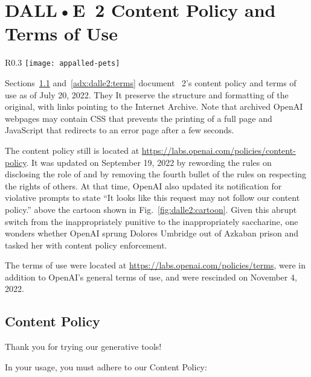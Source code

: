 
\newpage
\section{DALL•E~2 Content Policy and Terms of Use}
\label{adx:dalle2:policies}

\begin{wrapfigure}[9]{R}{0.3\textwidth}
\centering
\texttt{[image: appalled-pets]}
\caption{Be nice to \DALLE's pets!}\label{fig:dalle2:cartoon}
\end{wrapfigure}

Sections~\ref{adx:dalle2:contentpolicy} and~\ref{adx:dalle2:terms} document
\DALLE~2's content policy and terms of use as of July 20, 2022. They It preserve
the structure and formatting of the original, with links pointing to the
Internet Archive. Note that archived OpenAI webpages may contain CSS that
prevents the printing of a full page and JavaScript that redirects to an error
page after a few seconds.

The content policy still is located at
\url{https://labs.openai.com/policies/content-policy}. It was updated on
September 19, 2022 by rewording the rules on disclosing the role of \AI{} and by
removing the fourth bullet of the rules on respecting the rights of others. At
that time, OpenAI also updated its notification for violative prompts to state
``It looks like this request may not follow our content policy.'' above the
cartoon shown in Fig.~\ref{fig:dalle2:cartoon}. Given this abrupt switch from
the inappropriately punitive to the inappropriately saccharine, one wonders
whether OpenAI sprung Dolores Umbridge out of Azkaban prison and tasked her with
content policy enforcement.

The terms of use were located at
\url{https://labs.openai.com/policies/terms}, were in addition to OpenAI's
general terms of use, and were rescinded on November 4, 2022.


\subsection{Content Policy}
\label{adx:dalle2:contentpolicy}

Thank you for trying our generative \AI{} tools!

\noindent In your usage, you must adhere to our Content Policy:

